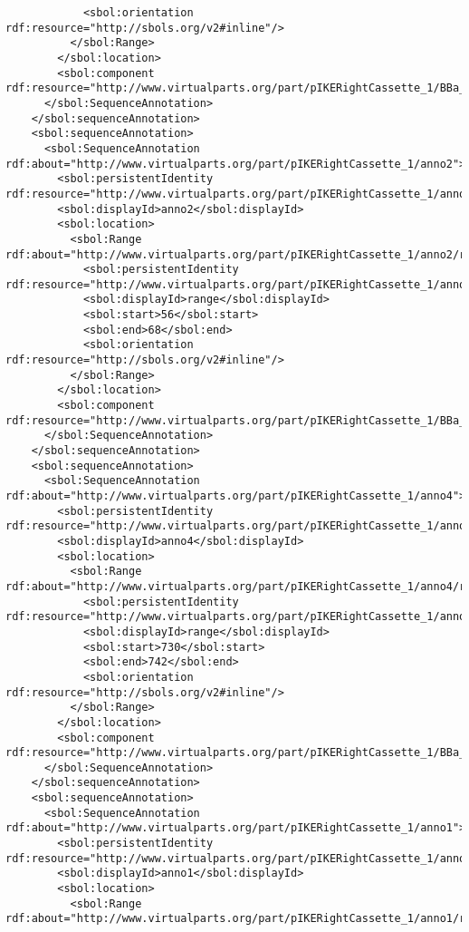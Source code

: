 \begin{lstlisting}
            <sbol:orientation rdf:resource="http://sbols.org/v2#inline"/>
          </sbol:Range>
        </sbol:location>
        <sbol:component rdf:resource="http://www.virtualparts.org/part/pIKERightCassette_1/BBa_C0040"/>
      </sbol:SequenceAnnotation>
    </sbol:sequenceAnnotation>
    <sbol:sequenceAnnotation>
      <sbol:SequenceAnnotation rdf:about="http://www.virtualparts.org/part/pIKERightCassette_1/anno2">
        <sbol:persistentIdentity rdf:resource="http://www.virtualparts.org/part/pIKERightCassette_1/anno2"/>
        <sbol:displayId>anno2</sbol:displayId>
        <sbol:location>
          <sbol:Range rdf:about="http://www.virtualparts.org/part/pIKERightCassette_1/anno2/range">
            <sbol:persistentIdentity rdf:resource="http://www.virtualparts.org/part/pIKERightCassette_1/anno2/range"/>
            <sbol:displayId>range</sbol:displayId>
            <sbol:start>56</sbol:start>
            <sbol:end>68</sbol:end>
            <sbol:orientation rdf:resource="http://sbols.org/v2#inline"/>
          </sbol:Range>
        </sbol:location>
        <sbol:component rdf:resource="http://www.virtualparts.org/part/pIKERightCassette_1/BBa_J61120"/>
      </sbol:SequenceAnnotation>
    </sbol:sequenceAnnotation>
    <sbol:sequenceAnnotation>
      <sbol:SequenceAnnotation rdf:about="http://www.virtualparts.org/part/pIKERightCassette_1/anno4">
        <sbol:persistentIdentity rdf:resource="http://www.virtualparts.org/part/pIKERightCassette_1/anno4"/>
        <sbol:displayId>anno4</sbol:displayId>
        <sbol:location>
          <sbol:Range rdf:about="http://www.virtualparts.org/part/pIKERightCassette_1/anno4/range">
            <sbol:persistentIdentity rdf:resource="http://www.virtualparts.org/part/pIKERightCassette_1/anno4/range"/>
            <sbol:displayId>range</sbol:displayId>
            <sbol:start>730</sbol:start>
            <sbol:end>742</sbol:end>
            <sbol:orientation rdf:resource="http://sbols.org/v2#inline"/>
          </sbol:Range>
        </sbol:location>
        <sbol:component rdf:resource="http://www.virtualparts.org/part/pIKERightCassette_1/BBa_J61130"/>
      </sbol:SequenceAnnotation>
    </sbol:sequenceAnnotation>
    <sbol:sequenceAnnotation>
      <sbol:SequenceAnnotation rdf:about="http://www.virtualparts.org/part/pIKERightCassette_1/anno1">
        <sbol:persistentIdentity rdf:resource="http://www.virtualparts.org/part/pIKERightCassette_1/anno1"/>
        <sbol:displayId>anno1</sbol:displayId>
        <sbol:location>
          <sbol:Range rdf:about="http://www.virtualparts.org/part/pIKERightCassette_1/anno1/range">

\end{lstlisting}
